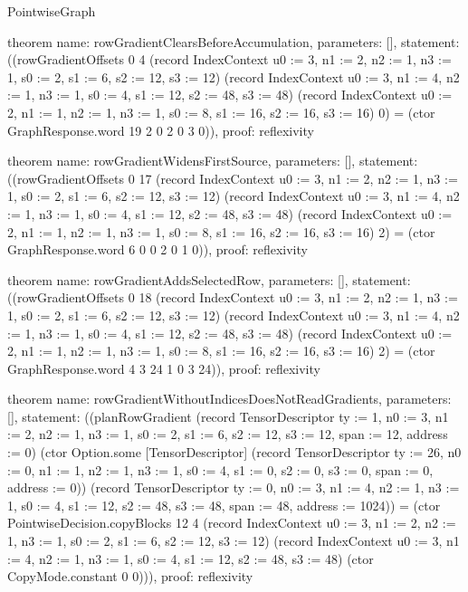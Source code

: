 \begin{lexlean}{PointwiseGraph}
\begin{semanticmodule}
theorem{
  name: rowGradientClearsBeforeAccumulation,
  parameters: [],
  statement: ((rowGradientOffsets 0 4 (record IndexContext {u0 := 3, n1 := 2, n2 := 1, n3 := 1, s0 := 2, s1 := 6, s2 := 12, s3 := 12}) (record IndexContext {u0 := 3, n1 := 4, n2 := 1, n3 := 1, s0 := 4, s1 := 12, s2 := 48, s3 := 48}) (record IndexContext {u0 := 2, n1 := 1, n2 := 1, n3 := 1, s0 := 8, s1 := 16, s2 := 16, s3 := 16}) 0) = (ctor GraphResponse.word 19 2 0 2 0 3 0)),
  proof: reflexivity{}
}

theorem{
  name: rowGradientWidensFirstSource,
  parameters: [],
  statement: ((rowGradientOffsets 0 17 (record IndexContext {u0 := 3, n1 := 2, n2 := 1, n3 := 1, s0 := 2, s1 := 6, s2 := 12, s3 := 12}) (record IndexContext {u0 := 3, n1 := 4, n2 := 1, n3 := 1, s0 := 4, s1 := 12, s2 := 48, s3 := 48}) (record IndexContext {u0 := 2, n1 := 1, n2 := 1, n3 := 1, s0 := 8, s1 := 16, s2 := 16, s3 := 16}) 2) = (ctor GraphResponse.word 6 0 0 2 0 1 0)),
  proof: reflexivity{}
}

theorem{
  name: rowGradientAddsSelectedRow,
  parameters: [],
  statement: ((rowGradientOffsets 0 18 (record IndexContext {u0 := 3, n1 := 2, n2 := 1, n3 := 1, s0 := 2, s1 := 6, s2 := 12, s3 := 12}) (record IndexContext {u0 := 3, n1 := 4, n2 := 1, n3 := 1, s0 := 4, s1 := 12, s2 := 48, s3 := 48}) (record IndexContext {u0 := 2, n1 := 1, n2 := 1, n3 := 1, s0 := 8, s1 := 16, s2 := 16, s3 := 16}) 2) = (ctor GraphResponse.word 4 3 24 1 0 3 24)),
  proof: reflexivity{}
}

theorem{
  name: rowGradientWithoutIndicesDoesNotReadGradients,
  parameters: [],
  statement: ((planRowGradient (record TensorDescriptor {ty := 1, n0 := 3, n1 := 2, n2 := 1, n3 := 1, s0 := 2, s1 := 6, s2 := 12, s3 := 12, span := 12, address := 0}) (ctor Option.some [TensorDescriptor] (record TensorDescriptor {ty := 26, n0 := 0, n1 := 1, n2 := 1, n3 := 1, s0 := 4, s1 := 0, s2 := 0, s3 := 0, span := 0, address := 0})) (record TensorDescriptor {ty := 0, n0 := 3, n1 := 4, n2 := 1, n3 := 1, s0 := 4, s1 := 12, s2 := 48, s3 := 48, span := 48, address := 1024})) = (ctor PointwiseDecision.copyBlocks 12 4 (record IndexContext {u0 := 3, n1 := 2, n2 := 1, n3 := 1, s0 := 2, s1 := 6, s2 := 12, s3 := 12}) (record IndexContext {u0 := 3, n1 := 4, n2 := 1, n3 := 1, s0 := 4, s1 := 12, s2 := 48, s3 := 48}) (ctor CopyMode.constant 0 0))),
  proof: reflexivity{}
}


\end{semanticmodule}
\end{lexlean}
